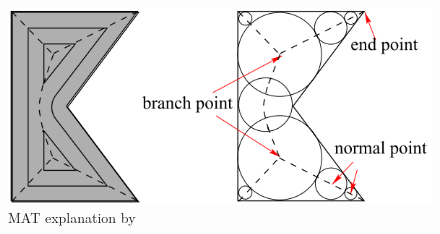 \begin{figure}
\centering
\includegraphics[width=.9\columnwidth]{sources/intro/medial_axis_Kao.png}
\caption{MAT explanation by \citeauthor{kao1998optimal}}
\label{MAT_explanation}
\end{figure}


